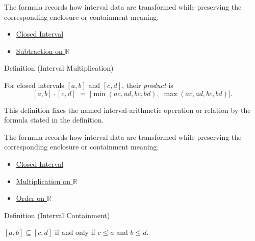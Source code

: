 \begin{remark*}[Interpretation]
The formula records how interval data are transformed while preserving the
corresponding enclosure or containment meaning.
\end{remark*}

\begin{dependencies}
\begin{itemize}
  \item \hyperref[def:closed-interval]{Closed Interval}
  \item \hyperref[def:subtraction-on-r]{Subtraction on $\mathbb{R}$}
\end{itemize}
\end{dependencies}

\begin{definitionbox}{Definition (Interval Multiplication)}
\begin{definition}\label{def:interval-mult}
For closed intervals $[a,b]$ and $[c,d]$, their \emph{product} is
\[
  [a,b] \cdot [c,d] \;=\;
  \bigl[\min(ac, ad, bc, bd),\; \max(ac, ad, bc, bd)\bigr].
\]
\end{definition}
\end{definitionbox}

\begin{remark*}
This definition fixes the named interval-arithmetic operation or relation by
the formula stated in the definition.
\end{remark*}

\begin{remark*}[Interpretation]
The formula records how interval data are transformed while preserving the
corresponding enclosure or containment meaning.
\end{remark*}

\begin{dependencies}
\begin{itemize}
  \item \hyperref[def:closed-interval]{Closed Interval}
  \item \hyperref[def:multiplication-on-r]{Multiplication on $\mathbb{R}$}
  \item \hyperref[def:order-on-r]{Order on $\mathbb{R}$}
\end{itemize}
\end{dependencies}

\begin{definitionbox}{Definition (Interval Containment)}
\begin{definition}\label{def:interval-contain}
$[a,b] \subseteq [c,d]$ if and only if $c \leq a$ and $b \leq d$.
\end{definition}
\end{definitionbox}

